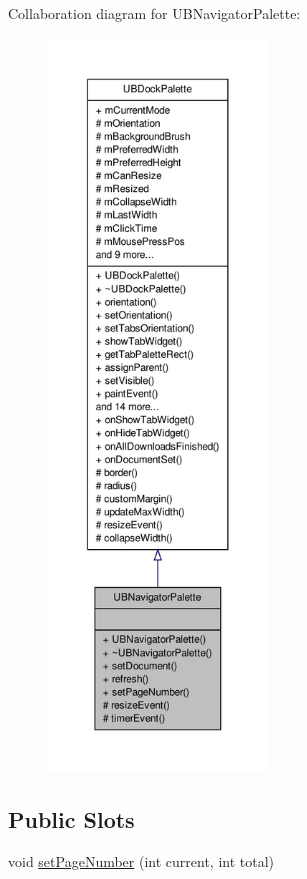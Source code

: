 Collaboration diagram for U\-B\-Navigator\-Palette\-:
\nopagebreak
\begin{figure}[H]
\begin{center}
\leavevmode
\includegraphics[height=550pt]{d2/d6c/class_u_b_navigator_palette__coll__graph}
\end{center}
\end{figure}
\subsection*{Public Slots}
\begin{DoxyCompactItemize}
\item 
void \hyperlink{class_u_b_navigator_palette_a2df6be11bde42dd31f45d37a5a4bbcf3}{set\-Page\-Number} (int current, int total)
\end{DoxyCompactItemize}
